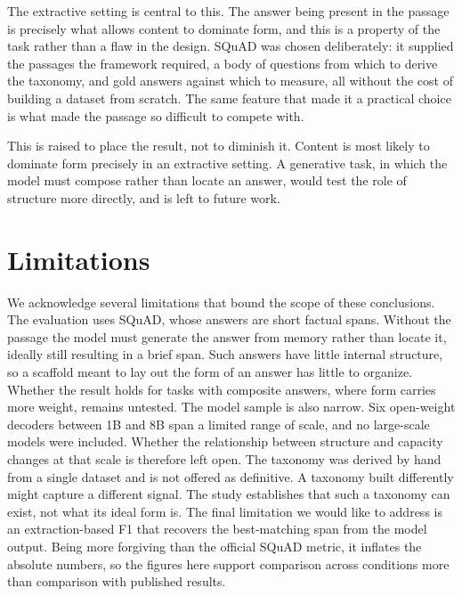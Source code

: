 \documentclass{article}
\begin{document}
The extractive setting is central to this. The answer being present in the passage is precisely what allows content to dominate form, and this is a property of the task rather than a flaw in the design. SQuAD was chosen deliberately: it supplied the passages the framework required, a body of questions from which to derive the taxonomy, and gold answers against which to measure, all without the cost of building a dataset from scratch. The same feature that made it a practical choice is what made the passage so difficult to compete with.

This is raised to place the result, not to diminish it. Content is most likely to dominate form precisely in an extractive setting. A generative task, in which the model must compose rather than locate an answer, would test the role of structure more directly, and is left to future work.

\section{Limitations}

We acknowledge several limitations that bound the scope of these conclusions. The evaluation uses SQuAD, whose answers are short factual spans. Without the passage the model must generate the answer from memory rather than locate it, ideally still resulting in a brief span. Such answers have little internal structure, so a scaffold meant to lay out the form of an answer has little to organize. Whether the result holds for tasks with composite answers, where form carries more weight, remains untested. The model sample is also narrow. Six open-weight decoders between 1B and 8B span a limited range of scale, and no large-scale models were included. Whether the relationship between structure and capacity changes at that scale is therefore left open. The taxonomy was derived by hand from a single dataset and is not offered as definitive. A taxonomy built differently might capture a different signal. The study establishes that such a taxonomy can exist, not what its ideal form is. The final limitation we would like to address is an extraction-based F1 that recovers the best-matching span from the model output. Being more forgiving than the official SQuAD metric, it inflates the absolute numbers, so the figures here support comparison across conditions more than comparison with published results.
\end{document}
